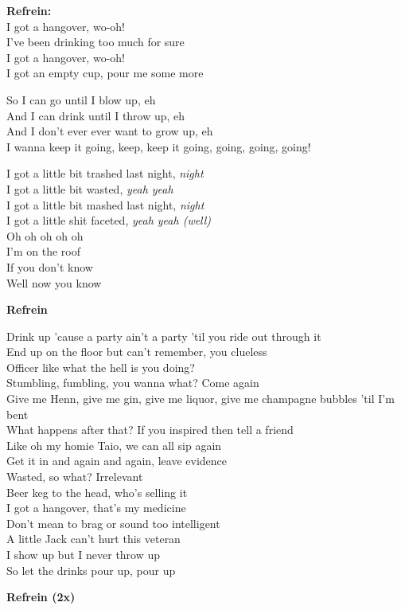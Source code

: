 \textbf{Refrein:}\\
I got a hangover, wo-oh!\\
I've been drinking too much for sure\\
I got a hangover, wo-oh!\\
I got an empty cup, pour me some more

So I can go until I blow up, eh\\
And I can drink until I throw up, eh\\
And I don't ever ever want to grow up, eh\\
I wanna keep it going, keep, keep it going, going, going, going!

I got a little bit trashed last night, \textit{night}\\
I got a little bit wasted, \textit{yeah yeah}\\
I got a little bit mashed last night, \textit{night}\\
I got a little shit faceted, \textit{yeah yeah (well)}\\
Oh oh oh oh oh\\
I'm on the roof\\
If you don't know\\
Well now you know

\textbf{Refrein}

Drink up 'cause a party ain't a party 'til you ride out through it\\
End up on the floor but can't remember, you clueless\\
Officer like what the hell is you doing?\\
Stumbling, fumbling, you wanna what? Come again\\
Give me Henn, give me gin, give me liquor, give me champagne bubbles 'til I'm bent\\
What happens after that? If you inspired then tell a friend\\
Like oh my homie Taio, we can all sip again\\
Get it in and again and again, leave evidence\\
Wasted, so what? Irrelevant\\
Beer keg to the head, who's selling it\\
I got a hangover, that's my medicine\\
Don't mean to brag or sound too intelligent\\
A little Jack can't hurt this veteran\\
I show up but I never throw up\\
So let the drinks pour up, pour up

\textbf{Refrein (2x)}